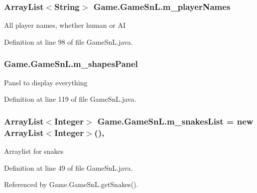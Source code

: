 \subsubsection[{m\+\_\+player\+Names}]{\setlength{\rightskip}{0pt plus 5cm}Array\+List$<$String$>$ Game.\+Game\+Sn\+L.\+m\+\_\+player\+Names\hspace{0.3cm}{\ttfamily [private]}}\label{class_game_1_1_game_sn_l_a0faf146bfc9f0bd5814b3b3c71c00a20}
All player names, whether human or A\+I 

Definition at line 98 of file Game\+Sn\+L.\+java.

\hypertarget{class_game_1_1_game_sn_l_af35fcedb0f8206713981e01068c3f281}{}
\subsubsection[{m\+\_\+shapes\+Panel}]{ Game.\+Game\+Sn\+L.\+m\+\_\+shapes\+Panel\hspace{0.3cm}{\ttfamily [private]}}\label{class_game_1_1_game_sn_l_af35fcedb0f8206713981e01068c3f281}
Panel to display everything 

Definition at line 119 of file Game\+Sn\+L.\+java.

\hypertarget{class_game_1_1_game_sn_l_a904b75e06e59aa1a9c028a948f98e33e}{}
\subsubsection[{m\+\_\+snakes\+List}]{\setlength{\rightskip}{0pt plus 5cm}Array\+List$<$Integer$>$ Game.\+Game\+Sn\+L.\+m\+\_\+snakes\+List = new Array\+List$<$Integer$>$()\hspace{0.3cm}{\ttfamily [static]}, {\ttfamily [private]}}\label{class_game_1_1_game_sn_l_a904b75e06e59aa1a9c028a948f98e33e}
Arraylist for snakes 

Definition at line 49 of file Game\+Sn\+L.\+java.



Referenced by Game.\+Game\+Sn\+L.\+get\+Snakes().

\hypertarget{class_game_1_1_game_sn_l_a0726c8332d62c46e936a13dc4d3abd1b}{}

